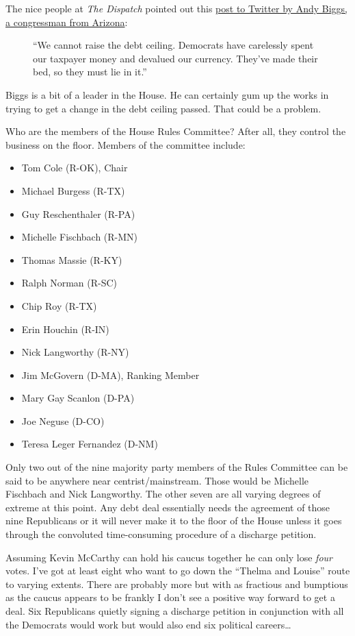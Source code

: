 The nice people at \emph{The Dispatch} pointed out this
\href{https://web.archive.org/web/20230120124257/https://twitter.com/repandybiggsaz/status/1615419794362142731}{post
to Twitter by Andy Biggs, a congressman from Arizona}:

\begin{figure}
\centering
{}
\caption{``We cannot raise the debt ceiling. Democrats have carelessly
spent our taxpayer money and devalued our currency. They've made their
bed, so they must lie in it.''}
\end{figure}

Biggs is a bit of a leader in the House. He can certainly gum up the
works in trying to get a change in the debt ceiling passed. That could
be a problem.

Who are the members of the House Rules Committee? After all, they
control the business on the floor. Members of the committee include:

\begin{itemize}
\tightlist
\item
  Tom Cole (R-OK), Chair
\item
  Michael Burgess (R-TX)
\item
  Guy Reschenthaler (R-PA)
\item
  Michelle Fischbach (R-MN)
\item
  Thomas Massie (R-KY)
\item
  Ralph Norman (R-SC)
\item
  Chip Roy (R-TX)
\item
  Erin Houchin (R-IN)
\item
  Nick Langworthy (R-NY)
\item
  Jim McGovern (D-MA), Ranking Member
\item
  Mary Gay Scanlon (D-PA)
\item
  Joe Neguse (D-CO)
\item
  Teresa Leger Fernandez (D-NM)
\end{itemize}

Only two out of the nine majority party members of the Rules Committee
can be said to be anywhere near centrist/mainstream. Those would be
Michelle Fischbach and Nick Langworthy. The other seven are all varying
degrees of extreme at this point. Any debt deal essentially needs the
agreement of those nine Republicans or it will never make it to the
floor of the House unless it goes through the convoluted time-consuming
procedure of a discharge petition.

Assuming Kevin McCarthy can hold his caucus together he can only lose
\emph{four} votes. I've got at least eight who want to go down the
``Thelma and Louise'' route to varying extents. There are probably more
but with as fractious and bumptious as the caucus appears to be frankly
I don't see a positive way forward to get a deal. Six Republicans
quietly signing a discharge petition in conjunction with all the
Democrats would work but would also end six political careers\ldots{}
